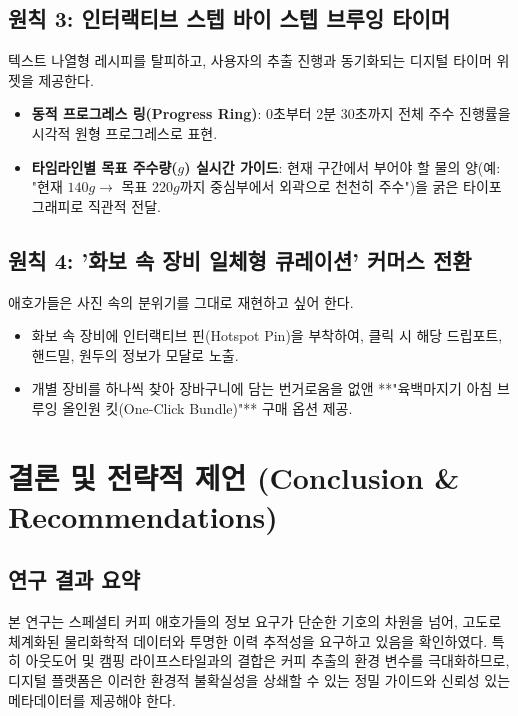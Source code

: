 \documentclass[10pt,a4paper]{article}
\begin{document}
\subsection{원칙 3: 인터랙티브 스텝 바이 스텝 브루잉 타이머}
텍스트 나열형 레시피를 탈피하고, 사용자의 추출 진행과 동기화되는 디지털 타이머 위젯을 제공한다.
\begin{itemize}[itemsep=2pt]
    \item \textbf{동적 프로그레스 링(Progress Ring)}: 0초부터 2분 30초까지 전체 주수 진행률을 시각적 원형 프로그레스로 표현.
    \item \textbf{타임라인별 목표 주수량($g$) 실시간 가이드}: 현재 구간에서 부어야 할 물의 양(예: "현재 $140g \rightarrow$ 목표 $220g$까지 중심부에서 외곽으로 천천히 주수")을 굵은 타이포그래피로 직관적 전달.
\end{itemize}

\subsection{원칙 4: '화보 속 장비 일체형 큐레이션' 커머스 전환}
애호가들은 사진 속의 분위기를 그대로 재현하고 싶어 한다.
\begin{itemize}[itemsep=2pt]
    \item 화보 속 장비에 인터랙티브 핀(Hotspot Pin)을 부착하여, 클릭 시 해당 드립포트, 핸드밀, 원두의 정보가 모달로 노출.
    \item 개별 장비를 하나씩 찾아 장바구니에 담는 번거로움을 없앤 **"육백마지기 아침 브루잉 올인원 킷(One-Click Bundle)"** 구매 옵션 제공.
\end{itemize}

\section{결론 및 전략적 제언 (Conclusion \& Recommendations)}

\subsection{연구 결과 요약}
본 연구는 스페셜티 커피 애호가들의 정보 요구가 단순한 기호의 차원을 넘어, 고도로 체계화된 물리화학적 데이터와 투명한 이력 추적성을 요구하고 있음을 확인하였다. 특히 아웃도어 및 캠핑 라이프스타일과의 결합은 커피 추출의 환경 변수를 극대화하므로, 디지털 플랫폼은 이러한 환경적 불확실성을 상쇄할 수 있는 정밀 가이드와 신뢰성 있는 메타데이터를 제공해야 한다.
\end{document}
